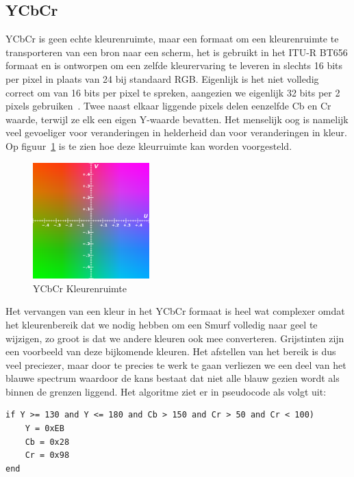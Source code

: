 	\newpage
	\subsection{YCbCr}
	\label{subsec:YCbCrSubSec}
		\par YCbCr is geen echte kleurenruimte, maar een formaat om een kleurenruimte te transporteren van een bron naar een scherm, het is gebruikt in het ITU-R BT656 formaat en is ontworpen om een zelfde kleurervaring te leveren in slechts 16 bits per pixel in plaats van 24 bij standaard RGB. Eigenlijk is het niet volledig correct om van 16 bits per pixel te spreken, aangezien we eigenlijk 32 bits per 2 pixels gebruiken~\cite{bib_2}. Twee naast elkaar liggende pixels delen eenzelfde Cb en Cr waarde, terwijl ze elk een eigen Y-waarde bevatten. Het menselijk oog is namelijk veel gevoeliger voor veranderingen in helderheid dan voor veranderingen in kleur. Op figuur~\ref{fig:YCbCrColorSpaceImage} is te zien hoe deze kleurruimte kan worden voorgesteld.

		\begin{figure}[H]
			\centering
			\includegraphics[width=0.4\textwidth]{Chapters/Chapter1/Images/YUVspace.png}
			\caption{YCbCr Kleurenruimte~\cite{bib_18}}
			\label{fig:YCbCrColorSpaceImage}
		\end{figure}

		\par Het vervangen van een kleur in het YCbCr formaat is heel wat complexer omdat het kleurenbereik dat we nodig hebben om een Smurf volledig naar geel te wijzigen, zo groot is dat we andere kleuren ook mee converteren. Grijstinten zijn een voorbeeld van deze bijkomende kleuren. Het afstellen van het bereik is dus veel preciezer, maar door te precies te werk te gaan verliezen we een deel van het blauwe spectrum waardoor de kans bestaat dat niet alle blauw gezien wordt als binnen de grenzen liggend. Het algoritme ziet er in pseudocode als volgt uit:
		\bigskip
		\begin{lstlisting}[language=VBScript, caption=Pseudocode voor het vervangen van blauw door geel]
if Y >= 130 and Y <= 180 and Cb > 150 and Cr > 50 and Cr < 100)
	Y = 0xEB
	Cb = 0x28
	Cr = 0x98
end		\end{lstlisting}

